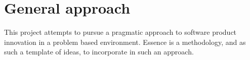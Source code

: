 
\section*{General approach}
\label{sec:general_approach}

This project attempts to pursue a pragmatic approach to software product innovation in a problem based environment. Essence \parencite{essence_book_2016_draft} is a methodology, and as such a template of ideas, to incorporate in such an approach.   


